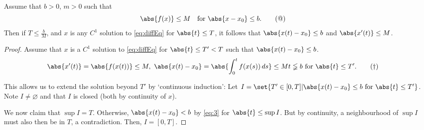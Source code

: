 \documentclass{article}
\renewcommand{\emptyset}{\varnothing}
\begin{document}
\begin{lemma}
    Assume that $b > 0$, $m > 0$ such that
    \begin{equation*}
        \abs{f(x)} \leq M \quad \text{for } \abs{x - x_0} \leq b. \tag{$@$} \label{eq:2}
    \end{equation*}
    Then if $T \leq \frac{b}{M}$, and $x$ is any $C^1$ solution to \eqref{eq:diffEq} for $\abs{t} \leq T$, it follows that $\abs{x(t) - x_0} \leq b$ and $\abs{x'(t)} \leq M$.
\end{lemma}

\begin{proof}
    Assume that $x$ is a $C^1$ solution to \eqref{eq:diffEq} for $\abs{t} \leq T' < T$ such that $\abs{x(t) - x_0} \leq b$.
    \begin{equation*}
        \abs{x'(t)} = \abs{f(x(t))} \leq M, \ \abs{x(t) - x_0} = \abs{\int_0^t f(x(s)) \, ds} \leq Mt \lneqq b \text{ for } \abs{t} \leq T'. \tag{$\dagger$} \label{eq:3}
    \end{equation*}

    This allows us to extend the solution beyond $T'$ by `continuous induction':
    Let $I = \set{T' \in [0, T] | \abs{x(t) - x_0} \leq b \text{ for } \abs{t} \leq T'}$. Note $I \neq \emptyset$ and that $I$ is closed (both by continuity of $x$).

    We now claim that $\sup I = T$.
    Otherwise, $\abs{x(t) - x_0} < b$ by \eqref{eq:3} for $\abs{t} \leq \sup I$.
    But by continuity, a neighbourhood of $\sup I$ must also then be in $T$, a contradiction.
    Then, $I = [0, T]$.
\end{proof}
\end{document}

